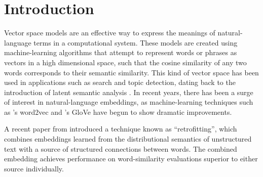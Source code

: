 \documentclass[11pt]{article}
\title{\thetitle}
\author{Robert Speer\\
    Luminoso Technologies, Inc.\\
    675 Massachusetts Ave.\\
    Cambridge, MA 02139\\
    \texttt{rspeer@luminoso.com}
\And
    Joshua Chin\\
    Union College\\
    807 Union St.\\
    Schenectady, NY 12308\\
    \texttt{joshuarchin@gmail.com}
}
\begin{document}
\maketitle
\begin{abstract}

A currently successful approach to computationally represent the meanings of
words is to represent them as vectors (embeddings) in a machine-learned vector
space. These embeddings are often evaluated on their ability to identify
similar or related words like a human would. In this paper, we show the
effectiveness of combining existing embeddings learned by GloVe
\cite{pennington2014glove} with structured knowledge from the semantic network
ConceptNet 5 \cite{speer2012conceptnet}, merging their information into a common
representation using an extension of the ``retrofitting'' technique
\cite{faruqui2015retrofitting}. The resulting vector space has a larger vocabulary
than either source, can represent word meanings in multiple languages, and
achieves state-of-the-art performance on word similarity evaluations.
Its score of $\rho = \scoreRW{}$ on an evaluation of rare words
\cite{luong2013rw} is 13.6\% higher than the previous best known system.

\end{abstract}

\section{Introduction}

Vector space models are an effective way to express the meanings of
natural-language terms in a computational system. These models are created
using machine-learning algorithms that attempt to represent words or phrases as
vectors in a high dimensional space, such that the cosine similarity of any two
words corresponds to their semantic similarity. This kind of vector space has
been used in applications such as search and topic detection, dating back to
the introduction of latent semantic analysis \cite{deerwester1990indexing}.  In
recent years, there has been a surge of interest in natural-language
embeddings, as machine-learning techniques such as
's word2vec and 's
GloVe have begun to show dramatic improvements.

A recent paper from  introduced a technique
known as ``retrofitting'', which combines embeddings learned from the
distributional semantics of unstructured text with a source of structured
connections between words. The combined embedding achieves performance on
word-similarity evaluations superior to either source individually.
\end{document}
